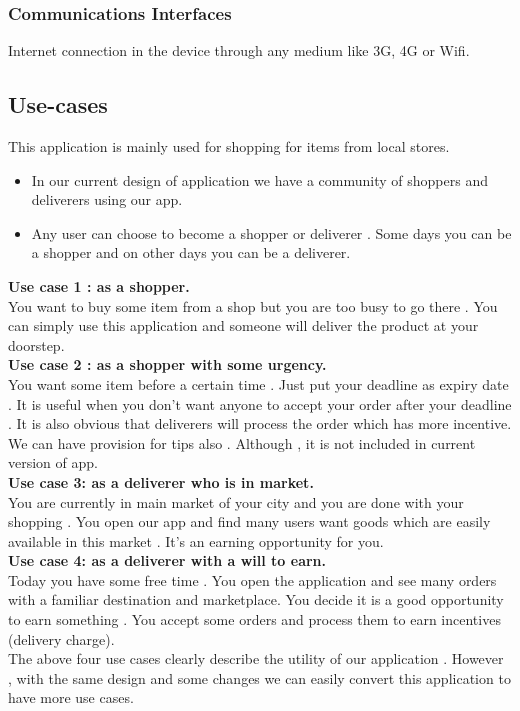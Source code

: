 \documentclass{report}
\begin{document}
\subsubsection{Communications Interfaces}
Internet connection in the device through any medium like 3G, 4G or Wifi.

\subsection{Use-cases}
This application is mainly used for shopping for items from local stores.
\begin{itemize}
\item In our current design of application we have a community of shoppers and deliverers using our app.
\item Any user can choose to become a shopper or deliverer . Some days you can be a shopper and on other days you can be a deliverer.
\end{itemize}

\textbf{Use case 1 :  as a shopper.}\\
You want to buy some item from a shop but you are too busy to go there . You can simply use this application and someone will deliver the product at your doorstep. \\

\textbf{Use case 2 : as a shopper with some urgency.}\\
You want  some item before a certain time . Just put your deadline as expiry date . It is useful when you don’t want anyone to accept your order  after your deadline . 
It is also obvious that deliverers will process the order which has more incentive. We can have provision for tips also . Although , it is not included in current version of app.\\

\textbf{Use case 3: as a deliverer who is in market.}\\
You are currently in main market of your city and you are done with your shopping . You open our app and find many users want goods which are easily available in this market  . It’s an earning opportunity for you.\\

\textbf{Use case 4: as a deliverer with a will to earn.}\\
Today you have some free time .  You open the application and see many orders with a familiar destination and marketplace. You decide  it is a good opportunity to earn something . You accept some orders and process them to earn incentives (delivery charge).\\
The above four use cases clearly describe the utility of our application . However , with the same design and some changes we can easily convert this application to have more use cases.\\
\end{document}
